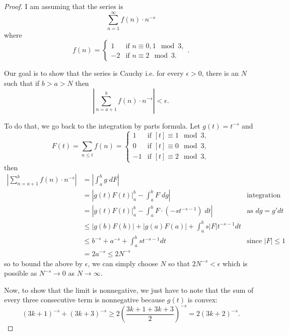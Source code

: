 \documentclass{article}
\newcommand{\Abs}[1]{\left| #1 \right|}
\begin{document}
\begin{proof}
I am assuming that the series is
$$\sum_{n=1}^{\infty} f(n) \cdot n^{-s}$$
where
$$f(n) = \begin{cases}
1 &\text{if } n \equiv 0, 1 \mod 3,\\
-2 &\text{if } n \equiv 2 \mod 3.
\end{cases}.$$

Our goal is to show that the series is Cauchy i.e. for every $\epsilon > 0$, there is an $N$ such that if $b > a > N$ then
$$\Abs{ \sum_{n=a + 1}^{b} f(n) \cdot n^{-s} } < \epsilon.$$

To do that, we go back to the integration by parts formula. Let $g(t) = t^{-s}$ and
$$F(t) = \sum_{n \leq t} f(n) = \begin{cases}
1 &\text{if } [t] \equiv 1 \mod 3,\\
0 &\text{if } [t] \equiv 0 \mod 3,\\
-1 &\text{if } [t] \equiv 2 \mod 3,
\end{cases}$$
then
\begin{align*}
\Abs{ \sum_{n=a + 1}^{b} f(n) \cdot n^{-s} } &= \Abs{ \int_a^b g \; dF }\\
&= \Abs{ \left. g(t) F(t) \right|_a^b - \int_a^b F \; dg } &\text{integration by parts}\\
&= \Abs{ \left. g(t) F(t) \right|_a^b - \int_a^b F \cdot (-s t^{-s-1}) \; dt } &\text{as } dg = g' dt\\
&\leq \Abs{g(b) F(b)} + \Abs{g(a) F(a)} + \int_a^b s |F| t^{-s-1} dt\\
&\leq b^{-s} + a^{-s} + \int_a^b s t^{-s-1} dt &\text{since } |F| \leq 1\\
&= 2a^{-s} \leq 2N^{-s}
\end{align*}
so to bound the above by $\epsilon$, we can simply choose $N$ so that $2 N^{-s} < \epsilon$ which is possible as $N^{-s} \rightarrow 0$ as $N \rightarrow \infty$.

Now, to show that the limit is nonnegative, we just have to note that the sum of every three consecutive term is nonnegative because $g(t)$ is convex:
$$(3k+1)^{-s} + (3k+3)^{-s} \geq 2 \left( \frac{3k+1 + 3k+3}{2} \right)^{-s} = 2(3k+2)^{-s}.$$
\end{proof}

\unless\ifdefined\IsMainDocument
\end{document}
